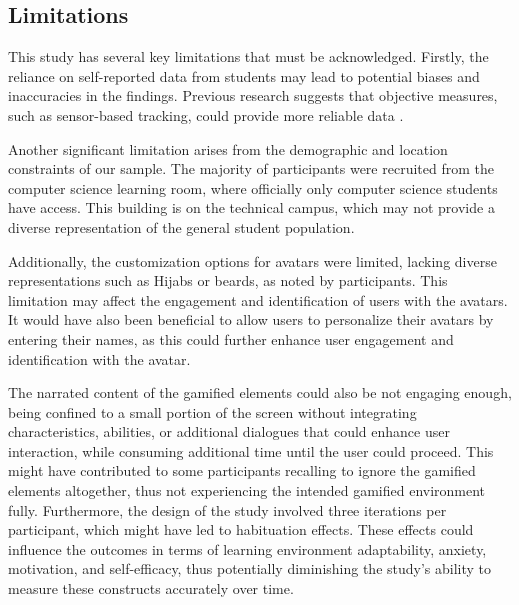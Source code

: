 

\subsection{Limitations}
This study has several key limitations that must be acknowledged.
Firstly, the reliance on self-reported data from students may lead to potential biases and inaccuracies in the findings. Previous research suggests that objective measures, such as sensor-based tracking, could provide more reliable data \parencite{woolfAffectiveTutorsAutomatic2010}.

Another significant limitation arises from the demographic and location constraints of our sample. The majority of participants were recruited from the computer science learning room, where officially only computer science students have access. This building is on the technical campus, which may not provide a diverse representation of the general student population.

Additionally, the customization options for avatars were limited, lacking diverse representations such as Hijabs or beards, as noted by participants. This limitation may affect the engagement and identification of users with the avatars. It would have also been beneficial to allow users to personalize their avatars by entering their names, as this could further enhance user engagement and identification with the avatar.

The narrated content of the gamified elements could also be not engaging enough, being confined to a small portion of the screen without integrating characteristics, abilities, or additional dialogues that could enhance user interaction, while consuming additional time until the user could proceed. This might have contributed to some participants recalling to ignore the gamified elements altogether, thus not experiencing the intended gamified environment fully.
Furthermore, the design of the study involved three iterations per participant, which might have led to habituation effects. These effects could influence the outcomes in terms of learning environment adaptability, anxiety, motivation, and self-efficacy, thus potentially diminishing the study's ability to measure these constructs accurately over time.

